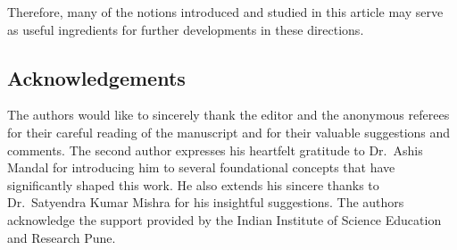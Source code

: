 \documentclass[pdftex]{sigma}
\numberwithin{equation}{section}
\theoremstyle{definition}
\begin{document}
Therefore, many of the notions introduced and studied in this article may serve as useful ingredients for further developments in these directions.

\subsection*{Acknowledgements}

The authors would like to sincerely thank the editor and the anonymous referees for their careful reading of the manuscript and for their valuable suggestions and comments.
The second author expresses his heartfelt gratitude to Dr.\ Ashis Mandal for introducing him to several foundational concepts that have significantly shaped this work. He also extends his sincere thanks to Dr.\ Satyendra Kumar Mishra for his insightful suggestions. The authors acknowledge the support provided by the Indian Institute of Science Education and Research Pune.
\end{document}
